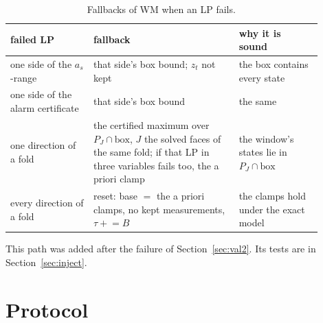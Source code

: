 \documentclass[11pt,a4paper]{article}
\begin{document}
\begin{table}[ht]
\centering\small
\caption{Fallbacks of WM when an LP fails.}\label{tab:fallback}
\begin{tabular}{>{\raggedright}p{0.24\linewidth}>{\raggedright}p{0.42\linewidth}>{\raggedright\arraybackslash}p{0.24\linewidth}}
\toprule
failed LP & fallback & why it is sound\\
\midrule
one side of the $a_s$-range & that side's box bound; $z_t$ not kept & the box contains every state\\
one side of the alarm certificate & that side's box bound & the same\\
one direction of a fold & the certified maximum over $P_J\cap\text{box}$, $J$ the solved faces of the same fold; if
that LP in three variables fails too, the a priori clamp & the window's states lie in $P_J\cap\text{box}$\\
every direction of a fold & reset: base $=$ the a priori clamps, no kept measurements, $\tau \mathrel{+}= B$ & the
clamps hold under the exact model\\
\bottomrule
\end{tabular}
\end{table}

This path was added after the failure of Section~\ref{sec:val2}. Its tests are in Section~\ref{sec:inject}.

\section{Protocol}\label{sec:protocol}
\end{document}
